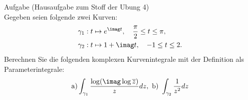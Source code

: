 \documentclass{scrartcl}
\begin{document}
\maketitle
\begin{section}{Aufgabe}%
    (Hausaufgabe zum Stoff der Ubung 4)\\
    Gegeben seien folgende zwei Kurven:
    \begin{align*}
        \gamma_1&: t\mapsto e^{\imag t},\quad \frac{\pi}{2}\leq t \leq \pi,\\
        \gamma_2&: t\mapsto 1+\imag t,\quad -1\leq t \leq 2.
    \end{align*}
Berechnen Sie die folgenden komplexen Kurvenintegrale mit der Definition als Parameterintegrale:
\[\text{a)} \int_{\gamma_1}\frac{\log(\imag \log \overline z)}{z}dz,\text{ b) }\int_{\gamma_2}\frac{1}{z^2}dz\]


\end{section}
\end{document}
